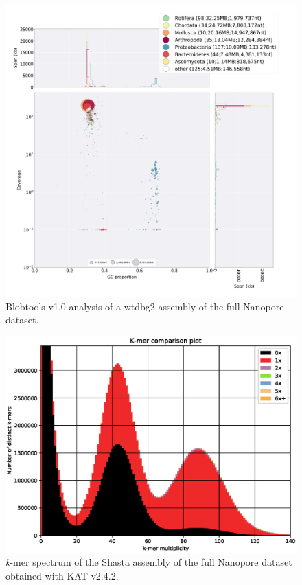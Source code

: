 \begin{suppsection}
 \begin{figure}[ht]
    \centering
     \includegraphics[width=15cm]{fig/benchmark/ONT_WTDBG.png}
   \caption{Blobtools v1.0 analysis of a wtdbg2 assembly of the full Nanopore dataset.}
   \label{fig:blobtools_wtdbg_ont}
 \end{figure}


     \begin{figure}[ht]
    \centering
     \includegraphics[width=13.5cm]{fig/benchmark/kat_comp_shasta_1-main.mx.spectra-cn.eps}
   \caption{\textit{k}-mer spectrum of the Shasta assembly of the full Nanopore dataset obtained with KAT v2.4.2.}
   \label{fig:kat_shasta_all}
 \end{figure}
 

\end{suppsection}

